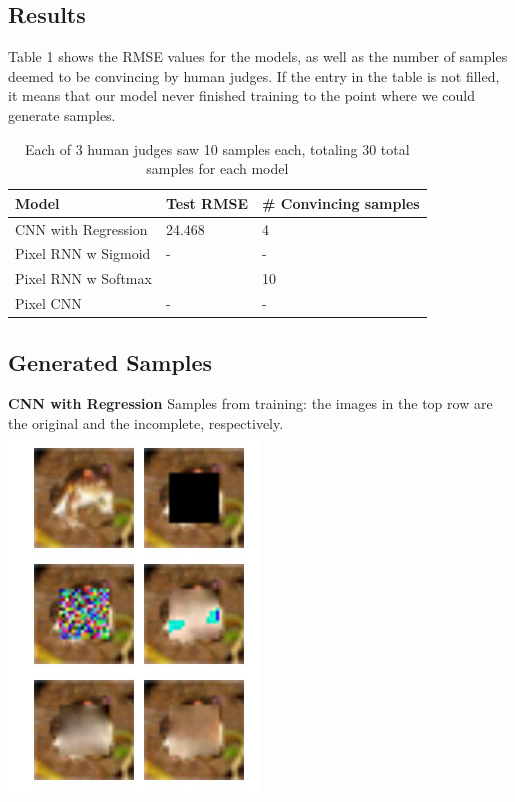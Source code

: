 \documentclass[10pt,twocolumn,letterpaper]{article}
\begin{document}
\subsection{Results}
Table 1 shows the RMSE values for the models, as well as the number of samples deemed to be convincing by human judges. If the entry in the table is not filled, it means that our model never finished training to the point where we could generate samples.
\begin{table}[!ht]
\centering
\caption{Each of 3 human judges saw 10 samples each, totaling 30 total samples for each model}
\begin{tabular}{lll}
\hline
Model               & Test RMSE & \# Convincing samples \\ \hline
CNN with Regression & 24.468    &  4                     \\
Pixel RNN w Sigmoid &   -       &  -                     \\
Pixel RNN w Softmax &           &  10                     \\
Pixel CNN           &   -       &  -                     \\ \hline
\end{tabular}
\end{table}

\subsection{Generated Samples}
\textbf{CNN with Regression}
Samples from training: the images in the top row are the original and the incomplete, respectively. \\
\includegraphics[width=0.8\linewidth]{baseline_train_frog.jpg} 
\end{document}
